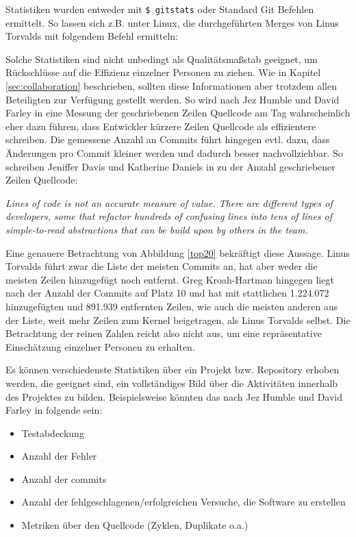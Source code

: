 Statistiken wurden entweder mit \texttt{\$ gitstats} \cite{link:gitstats} oder
Standard Git Befehlen ermittelt. So lassen sich z.B. unter Linux, die
durchgeführten Merges von Linus Torvalds mit folgendem Befehl ermitteln:


Solche Statistiken sind nicht unbedingt als Qualitätsmaßstab geeignet, um
Rückschlüsse auf die Effizienz einzelner Personen zu ziehen. Wie in Kapitel
\ref{sec:collaboration} beschrieben, sollten diese Informationen aber trotzdem
allen Beteiligten zur Verfügung gestellt werden.  So wird nach Jez Humble und
David Farley in \cite[S.~138]{cd} eine Messung der geschriebenen Zeilen
Quellcode am Tag wahrscheinlich eher dazu führen, dass Entwickler kürzere Zeilen
Quellcode als effizientere schreiben. Die gemessene Anzahl an Commits führt hingegen
evtl. dazu, dass Änderungen pro Commit kleiner werden und dadurch besser
nachvollziehbar. So schreiben Jeniffer Davis und Katherine Daniels in
\cite[S.~179]{effdo} zu der Anzahl geschriebener Zeilen Quellcode:
\begin{center}
\textit{\glqq{}Lines of code is not an accurate measure of value. There are
different types of developers, some that refactor hundreds of confusing lines
into tens of lines of simple-to-read abstractions that can be build upon by
others in the team.\grqq{}}
\end{center}

Eine genauere Betrachtung von Abbildung \ref{top20} bekräftigt diese Aussage.
Linus Torvalds führt zwar die Liste der meisten Commits an, hat aber weder die
meisten Zeilen hinzugefügt noch entfernt. Greg Kroah-Hartman hingegen liegt
nach der Anzahl der Commits auf Platz 10 und hat mit stattlichen 1.224.072
hinzugefügten und 891.939 entfernten Zeilen, wie auch die meisten anderen aus
der Liste, weit mehr Zeilen zum Kernel beigetragen, als Linus Torvalds selbst.
Die Betrachtung der reinen Zahlen reicht also nicht aus, um eine repräsentative
Einschätzung einzelner Personen zu erhalten.

Es können verschiedenste Statistiken über ein Projekt bzw. Repository erhoben
werden, die geeignet sind, ein vollständiges Bild über die Aktivitäten
innerhalb des Projektes zu bilden. Beispielsweise könnten das nach Jez Humble
und David Farley in \cite[S.~138]{cd} folgende sein:

\begin{itemize}
\item Testabdeckung
\item Anzahl der Fehler
\item Anzahl der \glspl{commit}
\item Anzahl der fehlgeschlagenen/erfolgreichen Versuche, die Software zu erstellen
\item Metriken über den Quellcode (Zyklen, Duplikate o.a.)
\end{itemize}
